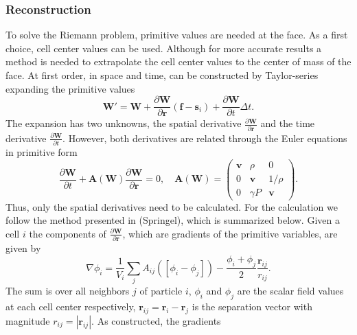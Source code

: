 \subsubsection{Reconstruction}
To solve the Riemann problem, primitive values are needed at the face. As a first
choice, cell center values can be used. Although for more accurate results a 
method is needed to extrapolate the cell center values to the center of mass of 
the face. At first order, in space and time, can be constructed by Taylor-series 
expanding the primitive values
%
\begin{equation}
	\label{eq.taylor}
	\mathbf{W}' = \mathbf{W} + \frac{\partial\mathbf{W}}{\partial\mathbf{r}}
    	(\mathbf{f}-\mathbf{s}_i) + \frac{\partial\mathbf{W}}
        {\partial t}{\Delta t}.
\end{equation}
%
The expansion has two unknowns, the spatial derivative
$\frac{\partial\mathbf{W}}{\partial \mathbf{r}}$ and the time derivative
$\frac{\partial\mathbf{W}}{\partial t}$. However, both derivatives
are related through the Euler equations in primitive form
%
\begin{equation}
	\label{eq.time.derivative}
    \frac{\partial\mathbf{W}}{\partial t}  + \mathbf{A}
    	(\mathbf{W})\frac{\partial\mathbf{W}}{\partial\mathbf{r}} = 0,
    \quad
    \mathbf{A}(\mathbf{W}) =
    \left(
    \begin{array}{ccc}
        \mathbf{v} & \rho & 0 \\
        0 & \mathbf{v} & 1/\rho \\
        0 & \gamma P & \mathbf{v}
    \end{array}
    \right).
\end{equation}
%
Thus, only the spatial derivatives need to be calculated. For the
calculation we follow the method presented in (Springel), which is
summarized below. Given a cell $i$ the components of 
$\frac{\partial\mathbf{W}}{\partial \mathbf{r}}$, which are gradients
of the primitive variables, are given by
%
\begin{equation}
	\nabla\phi_i = \frac{1}{V_i}\sum_{j}A_{ij}
    	\left(\left[\phi_i - \phi_j\right]\right) -
        \frac{\phi_i + \phi_j}{2}
        \frac{\mathbf{r}_{ij}}{r_{ij}}.
\end{equation}
%
The sum is over all neighbors $j$ of particle $i$, $\phi_i$ and
$\phi_j$ are the scalar field values at each cell center respectively,
$\mathbf{r}_{ij} = \mathbf{r}_i - \mathbf{r}_j$ is the separation vector
with magnitude $r_{ij} =|\mathbf{r}_{ij}|$. As constructed, the gradients
